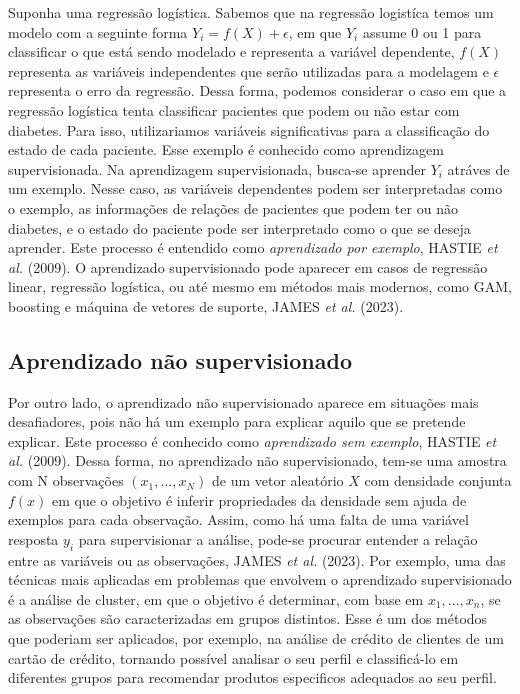 \documentclass[
  letterpaper,
  DIV=11,
  numbers=noendperiod]{scrreprt}
\begin{document}
Suponha uma regressão logística. Sabemos que na regressão logistíca
temos um modelo com a seguinte forma
\(Y_i = f\left(X\right) + \epsilon\), em que \(Y_i\) assume 0 ou 1 para
classificar o que está sendo modelado e representa a variável
dependente, \(f\left(X\right)\) representa as variáveis independentes
que serão utilizadas para a modelagem e \(\epsilon\) representa o erro
da regressão. Dessa forma, podemos considerar o caso em que a regressão
logística tenta classificar pacientes que podem ou não estar com
diabetes. Para isso, utilizariamos variáveis significativas para a
classificação do estado de cada paciente. Esse exemplo é conhecido como
aprendizagem supervisionada. Na aprendizagem supervisionada, busca-se
aprender \(Y_i\) atráves de um exemplo. Nesse caso, as variáveis
dependentes podem ser interpretadas como o exemplo, as informações de
relações de pacientes que podem ter ou não diabetes, e o estado do
paciente pode ser interpretado como o que se deseja aprender. Este
processo é entendido como \emph{aprendizado por exemplo}, HASTIE
\emph{et al.} (2009). O aprendizado supervisionado pode aparecer em
casos de regressão linear, regressão logística, ou até mesmo em métodos
mais modernos, como GAM, boosting e máquina de vetores de suporte, JAMES
\emph{et al.} (2023).

\subsection{Aprendizado não
supervisionado}\label{aprendizado-nuxe3o-supervisionado}

\hfill\break

Por outro lado, o aprendizado não supervisionado aparece em situações
mais desafiadores, pois não há um exemplo para explicar aquilo que se
pretende explicar. Este processo é conhecido como \emph{aprendizado sem
exemplo}, HASTIE \emph{et al.} (2009). Dessa forma, no aprendizado não
supervisionado, tem-se uma amostra com N observações
\(\left(x_1, ..., x_N\right)\) de um vetor aleatório \(X\) com densidade
conjunta \(f\left(x\right)\) em que o objetivo é inferir propriedades da
densidade sem ajuda de exemplos para cada observação. Assim, como há uma
falta de uma variável resposta \(y_i\) para supervisionar a análise,
pode-se procurar entender a relação entre as variáveis ou as
observações, JAMES \emph{et al.} (2023). Por exemplo, uma das técnicas
mais aplicadas em problemas que envolvem o aprendizado supervisionado é
a análise de cluster, em que o objetivo é determinar, com base em
\(x_1, ..., x_n\), se as observações são caracterizadas em grupos
distintos. Esse é um dos métodos que poderiam ser aplicados, por
exemplo, na análise de crédito de clientes de um cartão de crédito,
tornando possível analisar o seu perfil e classificá-lo em diferentes
grupos para recomendar produtos especificos adequados ao seu perfil.
\end{document}

